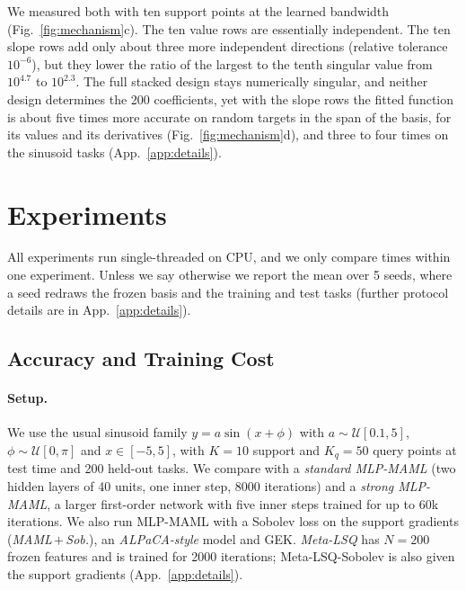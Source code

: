 \documentclass[fullpaper,final]{nldl}
\theoremstyle{plain}
\theoremstyle{definition}
\begin{document}
We measured both with ten support points at the learned bandwidth
(Fig.~\ref{fig:mechanism}c). The ten value rows are essentially independent. The ten
slope rows add only about three more independent directions (relative tolerance
$10^{-6}$), but they lower the
ratio of the largest to the tenth singular value from $10^{4.7}$ to $10^{2.3}$.
The full stacked design stays numerically singular, and neither design determines
the 200 coefficients, yet with the slope rows the fitted function is about five
times more accurate on random targets in the span of the basis, for its values and
its derivatives (Fig.~\ref{fig:mechanism}d), and three to four times on the sinusoid
tasks (App.~\ref{app:details}).

\section{Experiments}
\label{sec:experiments}

All experiments run single-threaded on CPU, and we only compare times within one
experiment. Unless we say otherwise we report the mean over 5 seeds, where a seed
redraws the frozen basis and the training and test tasks (further protocol details
are in App.~\ref{app:details}).

\subsection{Accuracy and Training Cost}
\label{sec:exp-works}

\paragraph{Setup.} We use the usual sinusoid family $y = a\sin(x+\phi)$ with
$a\sim\mathcal{U}[0.1,5]$, $\phi\sim\mathcal{U}[0,\pi]$ and $x \in [-5,5]$, with
$K{=}10$ support and $K_q{=}50$ query points at test time and 200 held-out tasks.
We compare with a \emph{standard MLP-MAML} (two hidden layers of 40 units, one inner
step, 8000 iterations) and a \emph{strong MLP-MAML}, a larger first-order network with
five inner steps trained for up to 60k iterations. We also run MLP-MAML with a
Sobolev loss on the support gradients (\emph{MAML\,$+$\,Sob.}), an
\emph{ALPaCA-style} model and GEK. \emph{Meta-LSQ} has $N{=}200$ frozen features
and is trained for 2000 iterations; Meta-LSQ-Sobolev is also given the support
gradients (App.~\ref{app:details}).
\end{document}
